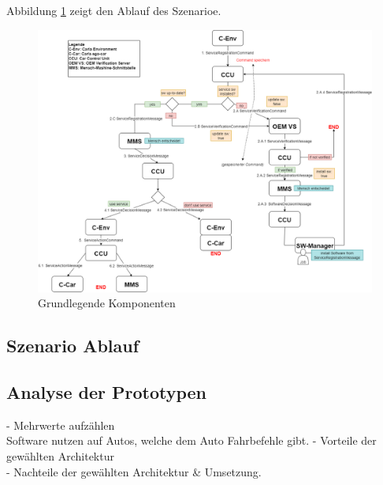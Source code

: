 Abbildung \ref{img:communication} zeigt den Ablauf des Szenarioe.
\begin{figure}[!h]
	\hspace{-2cm}
	\includegraphics[width=1.2\columnwidth]{pictures/Communication.png}
	\caption{Grundlegende Komponenten}
	\label{img:communication}
\end{figure}

\subsection{Szenario Ablauf}

\subsection{Analyse der Prototypen}
- Mehrwerte aufzählen\\
   Software nutzen auf Autos, welche dem Auto Fahrbefehle gibt.
- Vorteile der gewählten Architektur\\
- Nachteile der gewählten Architektur \& Umsetzung.